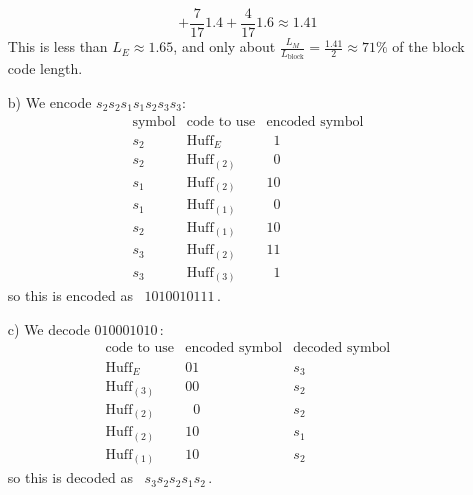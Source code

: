 \documentclass[11pt]{article}
\newcommand{\ph}{\phantom}
\begin{document}
\begin{itemize}
\[         + \frac{7}{17}1.4
         + \frac{4}{17}1.6
         \approx 1.41
   \]
   This is less than $L_E \approx 1.65$,
   and only about $\frac{L_M}{L_\text{block}} = \frac{1.41}{2} \approx 71\%$ of the block code length.
\item[{b)}] We encode $s_2s_2s_1s_1s_2s_3s_3$:
  \[\begin{array}{clc}
     \text{symbol} & \text{code to use} & \text{encoded symbol}\\\hline
          s_2 & \text{Huff}_E     & \ph{1}1\\
          s_2 & \text{Huff}_{(2)} & \ph{1}0\\
          s_1 & \text{Huff}_{(2)} &      10\\
          s_1 & \text{Huff}_{(1)} & \ph{1}0\\
          s_2 & \text{Huff}_{(1)} &      10\\
          s_3 & \text{Huff}_{(2)} &      11\\
          s_3 & \text{Huff}_{(3)} & \ph{1}1
    \end{array}\]
so this is encoded as \, $1 0 10 0 10 11 1$\,.
\item[{c)}] We decode $01 00 0 10 10$\,:
  \[\begin{array}{lcc}
     \text{code to use}  & \text{encoded symbol} & \text{decoded symbol}\\\hline
       \text{Huff}_E     &           01          &          s_3         \\
       \text{Huff}_{(3)} &           00          &          s_2         \\
       \text{Huff}_{(2)} &      \ph{x}0          &          s_2         \\
       \text{Huff}_{(2)} &           10          &          s_1         \\
       \text{Huff}_{(1)} &           10          &          s_2
    \end{array}\]
so this is decoded as \, $s_3s_2s_2s_1s_2$\,.
\end{itemize}
\end{document}
